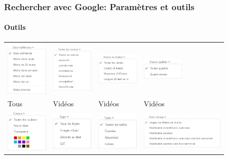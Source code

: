 \documentclass{beamer}
\begin{document}
\begin{frame}
\frametitle{Rechercher avec Google: Paramètres et outils}
\framesubtitle{Outils}

\begin{tabular}{llll}
	
	\includegraphics[width=2cm]{..//img/Bweb02-ri-gmail/google-outils-date.png} &
	\includegraphics[width=2cm]{..//img/Bweb02-ri-gmail/google-outils-source.png} &
	\includegraphics[width=2cm]{..//img/Bweb02-ri-gmail/google-outils-duree.png} &
	\includegraphics[width=2cm]{..//img/Bweb02-ri-gmail/google-outils-qualite.png} \\
	
	Tous &
	Vidéos &
	Vidéos &
	Vidéos \\
	
	\includegraphics[width=2cm]{..//img/Bweb02-ri-gmail/google-outils-couleur.png} &
	\includegraphics[width=2cm]{..//img/Bweb02-ri-gmail/google-outils-type.png} &
	\includegraphics[width=2cm]{..//img/Bweb02-ri-gmail/google-outils-taille.png} &
	\includegraphics[width=4cm]{..//img/Bweb02-ri-gmail/google-outils-droit.png} \\
	

\end{tabular}
\end{frame}
\end{document}
